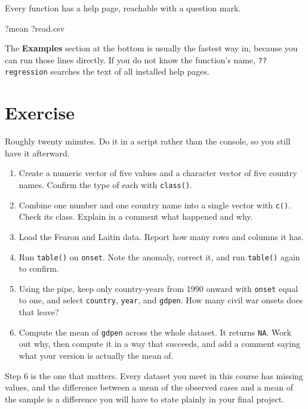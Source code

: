 \documentclass[
  a4paper,
]{scrbook}
\newenvironment{Shaded}{\begin{snugshade}}{\end{snugshade}}
\newcommand{\NormalTok}[1]{\textcolor[rgb]{0.00,0.23,0.31}{#1}}
\begin{document}

Every function has a help page, reachable with a question mark.

\begin{Shaded}
\begin{Highlighting}[]
\NormalTok{?mean}
\NormalTok{?read.csv}
\end{Highlighting}
\end{Shaded}

The \textbf{Examples} section at the bottom is usually the fastest way
in, because you can run those lines directly. If you do not know the
function's name, \texttt{??regression} searches the text of all
installed help pages.

\section*{Exercise}\label{exercise-1}


Roughly twenty minutes. Do it in a script rather than the console, so
you still have it afterward.

\begin{enumerate}
\def\labelenumi{\arabic{enumi}.}
\item
  Create a numeric vector of five values and a character vector of five
  country names. Confirm the type of each with \texttt{class()}.
\item
  Combine one number and one country name into a single vector with
  \texttt{c()}. Check its class. Explain in a comment what happened and
  why.
\item
  Load the Fearon and Laitin data. Report how many rows and columns it
  has.
\item
  Run \texttt{table()} on \texttt{onset}. Note the anomaly, correct it,
  and run \texttt{table()} again to confirm.
\item
  Using the pipe, keep only country-years from 1990 onward with
  \texttt{onset} equal to one, and select \texttt{country},
  \texttt{year}, and \texttt{gdpen}. How many civil war onsets does that
  leave?
\item
  Compute the mean of \texttt{gdpen} across the whole dataset. It
  returns \texttt{NA}. Work out why, then compute it in a way that
  succeeds, and add a comment saying what your version is actually the
  mean of.
\end{enumerate}

Step 6 is the one that matters. Every dataset you meet in this course
has missing values, and the difference between a mean of the observed
cases and a mean of the sample is a difference you will have to state
plainly in your final project.
\end{document}
